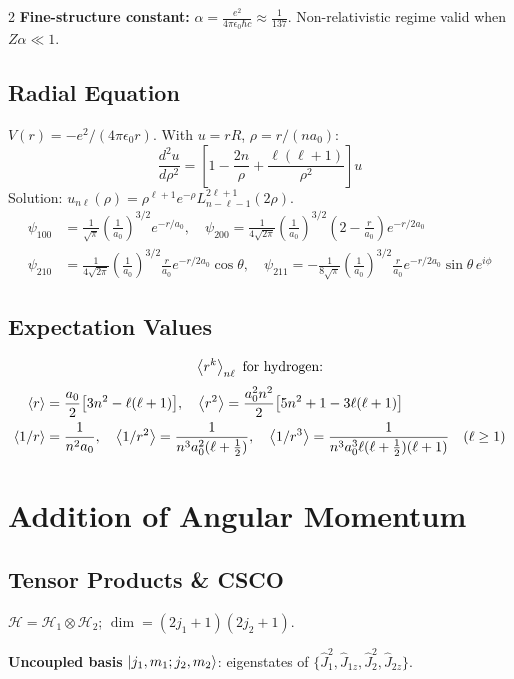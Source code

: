 \documentclass[9pt,a4paper]{article} %
\newcommand{\HH}{\mathcal{H}}
\begin{document}
\begin{multicols}{2}
\textbf{Fine-structure constant:}
$\alpha=\frac{e^2}{4\pi\epsilon_0\hbar c}\approx\frac{1}{137}$.
Non-relativistic regime valid when $Z\alpha\ll 1$.
\subsection{Radial Equation}
$V(r) = -e^2/(4\pi\epsilon_0 r)$. With $u = rR$, $\rho = r/(na_0)$:
\[
\frac{d^2 u}{d\rho^2} = \left[1 - \frac{2n}{\rho} + \frac{\ell(\ell+1)}{\rho^2}\right]u
\]
Solution: $u_{n\ell}(\rho) = \rho^{\ell+1} e^{-\rho} L_{n-\ell-1}^{2\ell+1}(2\rho)$.
{\footnotesize
\begin{align*}
\psi_{100} &= \frac{1}{\sqrt{\pi}}\left(\frac{1}{a_0}\right)^{3/2} e^{-r/a_0},\quad 
\psi_{200} = \frac{1}{4\sqrt{2\pi}}\left(\frac{1}{a_0}\right)^{3/2}\left(2 - \frac{r}{a_0}\right)e^{-r/2a_0} \\
\psi_{210} &= \frac{1}{4\sqrt{2\pi}}\left(\frac{1}{a_0}\right)^{3/2}\frac{r}{a_0}e^{-r/2a_0}\cos\theta, \quad
\psi_{211} = -\frac{1}{8\sqrt{\pi}}\left(\frac{1}{a_0}\right)^{3/2}\frac{r}{a_0}e^{-r/2a_0}\sin\theta\,e^{i\phi}
\end{align*}
}

\subsection{Expectation Values}
\[
\ev{r^k}_{n\ell} \text{ for hydrogen:}
\]
{\footnotesize
\begin{align*}
\ev{r} &= \frac{a_0}{2}\bigl[3n^2 - \ell(\ell+1)\bigr] ,\quad
\ev{r^2} = \frac{a_0^2 n^2}{2}\bigl[5n^2 + 1 - 3\ell(\ell+1)\bigr] \\
\ev{1/r} &= \frac{1}{n^2 a_0},\quad
\ev{1/r^2} = \frac{1}{n^3 a_0^2 (\ell+\frac{1}{2})} ,\quad
\ev{1/r^3} = \frac{1}{n^3 a_0^3 \ell(\ell+\frac{1}{2})(\ell+1)} \quad (\ell \ge 1)
\end{align*}
}

\section{Addition of Angular Momentum}

\subsection{Tensor Products \& CSCO}
$\HH=\HH_1\otimes\HH_2$;\; $\dim=(2j_1+1)(2j_2+1)$.

\textbf{Uncoupled basis} $\ket{j_1,m_1;j_2,m_2}$: eigenstates of $\{\hat{J}_1^2,\hat{J}_{1z},\hat{J}_2^2,\hat{J}_{2z}\}$.


\end{multicols}
\end{document}
